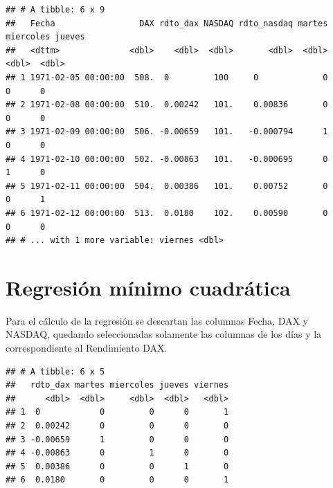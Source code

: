 \documentclass[
  11pt,
]{article}
\newenvironment{Shaded}{\begin{snugshade}}{\end{snugshade}}
\newcommand{\KeywordTok}[1]{\textcolor[rgb]{0.13,0.29,0.53}{\textbf{#1}}}
\newcommand{\NormalTok}[1]{#1}
\newcommand{\OperatorTok}[1]{\textcolor[rgb]{0.81,0.36,0.00}{\textbf{#1}}}
\newcommand{\StringTok}[1]{\textcolor[rgb]{0.31,0.60,0.02}{#1}}
\begin{document}
\begin{verbatim}
## # A tibble: 6 x 9
##   Fecha                 DAX rdto_dax NASDAQ rdto_nasdaq martes miercoles jueves
##   <dttm>              <dbl>    <dbl>  <dbl>       <dbl>  <dbl>     <dbl>  <dbl>
## 1 1971-02-05 00:00:00  508.  0         100     0             0         0      0
## 2 1971-02-08 00:00:00  510.  0.00242   101.    0.00836       0         0      0
## 3 1971-02-09 00:00:00  506. -0.00659   101.   -0.000794      1         0      0
## 4 1971-02-10 00:00:00  502. -0.00863   101.   -0.000695      0         1      0
## 5 1971-02-11 00:00:00  504.  0.00386   101.    0.00752       0         0      1
## 6 1971-02-12 00:00:00  513.  0.0180    102.    0.00590       0         0      0
## # ... with 1 more variable: viernes <dbl>
\end{verbatim}

\hypertarget{regresiuxf3n-muxednimo-cuadruxe1tica}{%
\section{Regresión mínimo
cuadrática}\label{regresiuxf3n-muxednimo-cuadruxe1tica}}

Para el cálculo de la regresión se descartan las columnas Fecha, DAX y
NASDAQ, quedando seleccionadas solamente las columnas de los días y la
correspondiente al Rendimiento DAX.

\begin{Shaded}
\end{Shaded}

\begin{verbatim}
## # A tibble: 6 x 5
##   rdto_dax martes miercoles jueves viernes
##      <dbl>  <dbl>     <dbl>  <dbl>   <dbl>
## 1  0            0         0      0       1
## 2  0.00242      0         0      0       0
## 3 -0.00659      1         0      0       0
## 4 -0.00863      0         1      0       0
## 5  0.00386      0         0      1       0
## 6  0.0180       0         0      0       1
\end{verbatim}
\end{document}
